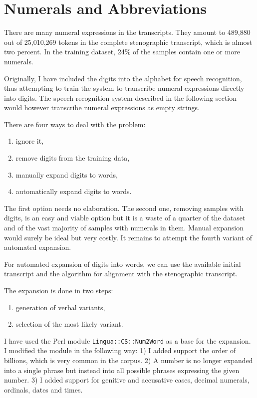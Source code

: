 \documentclass[conference]{IEEEtran}
\begin{document}
\section{Numerals and Abbreviations}

There are many numeral expressions in the transcripts. They amount to 489,880
out of 25,010,269 tokens in the complete stenographic transcript, which is
almost two percent. In the training dataset, 24\% of the samples contain one or
more numerals.

Originally, I have included the digits into the alphabet for speech recognition,
thus attempting to train the system to transcribe numeral expressions directly
into digits. The speech recognition system described in the following section
would however transcribe numeral expressions as empty strings.

There are four ways to deal with the problem:
\begin{enumerate}
\item{ignore it,}
\item{remove digits from the training data,}
\item{manually expand digits to words,}
\item{automatically expand digits to words.}
\end{enumerate}

The first option needs no elaboration. The second one, removing samples with
digits, is an easy and viable option but it is a waste of a quarter of the
dataset and of the vast majority of samples with numerals in them. Manual
expansion would surely be ideal but very costly. It remains to attempt the
fourth variant of automated expansion.

For automated expansion of digits into words, we can use the available initial
transcript and the algorithm for alignment with the stenographic transcript.

The expansion is done in two steps:
\begin{enumerate}
\item{generation of verbal variants,}
\item{selection of the most likely variant.}
\end{enumerate}

I have used the Perl module \texttt{Lingua::CS::Num2Word} as a base for the
expansion. I modified the module in the following way: 1) I added support
the order of billions, which is very common in the corpus. 2) A number is no
longer expanded into a single phrase but instead into all possible phrases
expressing the given number. 3) I added support for genitive and accusative
cases, decimal numerals, ordinals, dates and times.
\end{document}
